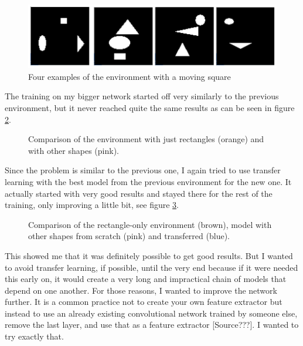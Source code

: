\documentclass[
  digital,     %
  oneside,     %
  nosansbold,  %
  nocolorbold, %
  lof,         %
  lot,         %
]{fithesis4}
\begin{document}
\begin{figure}
    \includegraphics[width=1\linewidth]{env_examples/env4.png}
    \caption{Four examples of the environment with a moving square}
    \label{fig:env4}
\end{figure}
 
The training on my bigger network started off very similarly to the previous environment, but it never reached quite the same results as can be seen in figure \ref{fig:v4_bigger_net}.

\begin{figure}
    \centering
    \makebox[\textwidth][c]{}
    \caption{Comparison of the environment with just rectangles (orange) and with other shapes (pink).}
    \label{fig:v4_bigger_net}
\end{figure}

Since the problem is similar to the previous one, I again tried to use transfer learning with the best model from the previous environment for the new one. It actually started with very good results and stayed there for the rest of the training, only improving a little bit, see figure \ref{fig:v4_transfer}.

\begin{figure}
    \centering
    \makebox[\textwidth][c]{}
    \caption{Comparison of the rectangle-only environment (brown), model with other shapes from scratch (pink) and transferred (blue).}
    \label{fig:v4_transfer}
\end{figure}

This showed me that it was definitely possible to get good results. But I wanted to avoid transfer learning, if possible, until the very end because if it were needed this early on, it would create a very long and impractical chain of models that depend on one another. For those reasons, I wanted to improve the network further. It is a common practice not to create your own feature extractor but instead to use an already existing convolutional network trained by someone else, remove the last layer, and use that as a feature extractor [Source???]. I wanted to try exactly that.
\end{document}
